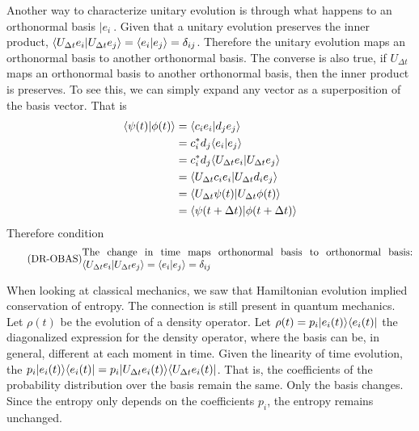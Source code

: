 Another way to characterize unitary evolution is through what happens to an orthonormal basis $|e_i\>$. Given that a unitary evolution preserves the inner product, $\langle U_{\Delta t} e_i | U_{\Delta t} e_j \rangle = \langle e_i | e_j \rangle = \delta_{ij}$. Therefore the unitary evolution maps an orthonormal basis to another orthonormal basis. The converse is also true, if $U_{\Delta t}$ maps an orthonormal basis to another orthonormal basis, then the inner product is preserves. To see this, we can simply expand any vector as a superposition of the basis vector. That is
\begin{equation}
	\begin{aligned}
		\langle\psi(t) | \phi(t)\rangle &= \langle c_i e_i | d_j e_j\rangle \\
		&= c_i^* d_j \langle e_i | e_j\rangle \\
		&= c_i^* d_j \langle U_{\Delta t} e_i | U_{\Delta t} e_j\rangle \\
		&= \langle U_{\Delta t} c_i e_i | U_{\Delta t} d_i e_j\rangle \\
		&= \langle U_{\Delta t} \psi(t) | U_{\Delta t} \phi(t)\rangle \\
		&= \langle \psi(t + \Delta t) | \phi(t + \Delta t)\rangle \\
	\end{aligned}
\end{equation}
Therefore condition
\begin{equation}\label{rp-qm-uev-condOrthonormalBasis}
	\tag{DR-OBAS}
	\eqtext{The change in time maps orthonormal basis to orthonormal basis: $\< U_{\Delta t} e_i | U_{\Delta t} e_j \> = \< e_i | e_j \> = \delta_{ij}$} 
\end{equation}

When looking at classical mechanics, we saw that Hamiltonian evolution implied conservation of entropy. The connection is still present in quantum mechanics. Let $\rho(t)$ be the evolution of a density operator. Let $\rho(t) = p_i |e_i(t) \rangle \langle e_i(t)|$ the diagonalized expression for the density operator, where the basis can be, in general, different at each moment in time. Given the linearity of time evolution, the $p_i |e_i(t) \rangle \langle e_i(t)| = p_i |U_{\Delta t}e_i(t) \rangle \langle U_{\Delta t} e_i(t)|$. That is, the coefficients of the probability distribution over the basis remain the same. Only the basis changes. Since the entropy only depends on the coefficients $p_i$, the entropy remains unchanged.

